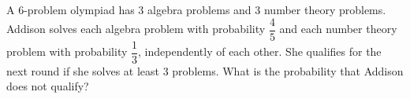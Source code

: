 A $6$-problem olympiad has $3$ algebra problems and $3$ number theory problems. Addison solves each algebra problem with probability $\dfrac45$ and each number theory problem with probability $\dfrac13$, independently of each other. She qualifies for the next round if she solves at least $3$ problems. What is the probability that Addison does not qualify?
